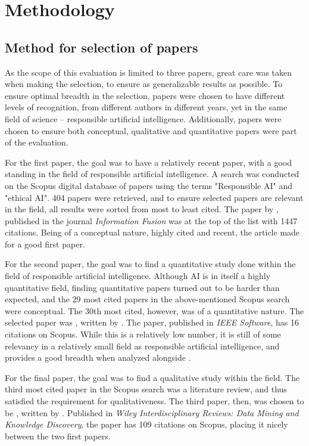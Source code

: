 \section{Methodology}

\subsection{Method for selection of papers}
\label{sec:paper-selection}
As the scope of this evaluation is limited to three papers, great care was taken when making the selection, to ensure as generalizable results as possible. To ensure optimal breadth in the selection, papers were chosen to have different levels of recognition, from different authors in different years, yet in the same field of science -- responsible artificial intelligence. Additionally, papers were chosen to ensure both conceptual, qualitative and quantitative papers were part of the evaluation.

For the first paper, the goal was to have a relatively recent paper, with a good standing in the field of responsible artificial intelligence. A search was conducted on the Scopus digital database of papers using the terms "Responsible AI" and "ethical AI". 404 papers were retrieved, and to ensure selected papers are relevant in the field, all results were sorted from most to least cited. The paper  by \textcite{Barredo_2020}, published in the journal \textit{Information Fusion} was at the top of the list with 1447 citations. Being of a conceptual nature, highly cited and recent, the article made for a good first paper.

For the second paper, the goal was to find a quantitative study done within the field of responsible artificial intelligence. Although AI is in itself a highly quantitative field, finding quantitative papers turned out to be harder than expected, and the 29 most cited papers in the above-mentioned Scopus search were conceptual. The 30th most cited, however, was of a quantitative nature. The selected paper was , written by \textcite{Vakkuri_2020}. The paper, published in \textit{IEEE Software}, has 16 citations on Scopus. While this is a relatively low number, it is still of some relevancy in a relatively small field as responsible artificial intelligence, and provides a good breadth when analyzed alongside \textcite{Barredo_2020}.

For the final paper, the goal was to find a qualitative study within the field. The third most cited paper in the Scopus search was a literature review, and thus satisfied the requirement for qualitativeness. The third paper, then, was chosen to be , written by \textcite{Ntoutsi_2020}. Published in \textit{Wiley Interdisciplinary Reviews: Data Mining and Knowledge Discovery}, the paper has 109 citations on Scopus, placing it nicely between the two first papers.

